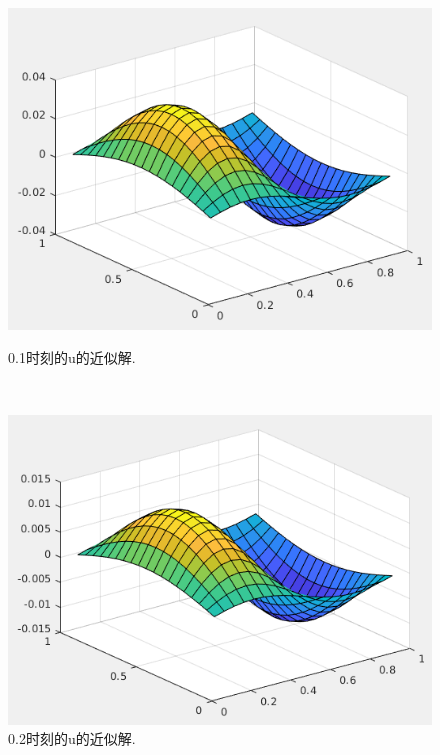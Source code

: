 \documentclass[12pt,a4paper]{article}
\begin{document}
\begin{figure}[ht]
	\begin{minipage}[t]{0.4\linewidth}%
		\centering     %
		\includegraphics[width=1.2\textwidth]{./figures/time01.png}
		\caption{0.1时刻的u的近似解.}%
		\label{fig:liuchengtu1}%
	\end{minipage} 
	\hfill
	\begin{minipage}[t]{0.4\linewidth}
		\centering
		\includegraphics[width=1.2\textwidth]{./figures/time02.png}
		\caption{0.2时刻的u的近似解.}%
		\label{fig:liuchengtu2}
	\end{minipage}
\end{figure}
\end{document}
